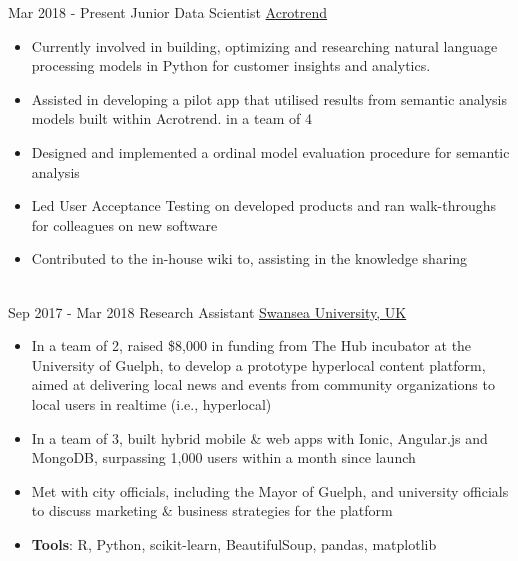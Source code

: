 \documentclass[letterpaper]{twentysecondcv} %
\begin{document}
\begin{twenty} %
	\twentyitem
	{Mar 2018 -}
	{Present}
	{Junior Data Scientist}
	{\href{https://acrotrend.com/}{Acrotrend}}
	{}
	{\begin{itemize}
			\item Currently involved in building, optimizing and researching natural language processing models in Python for customer insights and analytics.
			\item Assisted in developing a pilot app that utilised results from semantic analysis models built within Acrotrend. in a team of 4
			\item Designed and implemented a ordinal model evaluation procedure for semantic analysis 
			\item Led User Acceptance Testing on developed products and ran walk-throughs for colleagues on new software
			\item Contributed to the in-house wiki to, assisting in the knowledge sharing 
	\end{itemize}}
	\\
	\twentyitem
	{Sep 2017 -}
	{Mar 2018}
	{Research Assistant}
	{\href{http://www.swansea.ac.uk/}{Swansea University, UK}}
	{}
	{
		{\begin{itemize}
				\item In a team of 2, raised \$8,000 in funding from The Hub incubator at the University of Guelph, to develop a prototype hyperlocal content platform, aimed at delivering local news and events from community organizations to local users in realtime (i.e., hyperlocal)
				\item In a team of 3, built hybrid mobile \& web apps with Ionic, Angular.js and MongoDB, surpassing 1,000 users within a month since launch
				\item Met with city officials, including the Mayor of Guelph, and university officials to discuss marketing \& business strategies for the platform
				\item \textbf{Tools}: R, Python, scikit-learn, BeautifulSoup, pandas, matplotlib \vspace{2mm} 
		\end{itemize}}
	}

	
	
\end{twenty}

\end{document}

